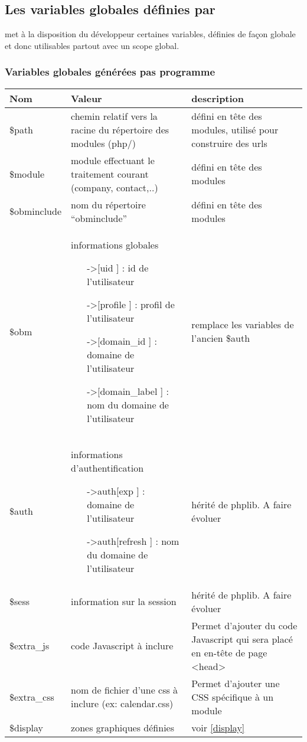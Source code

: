 

\subsection{Les variables globales définies par \obm}
\label{global_vars}

\obm met à la disposition du développeur certaines variables, définies de façon globale et donc utilisables partout avec un scope global.


\subsubsection{Variables globales générées pas programme}

\begin{tabular}{|p{2cm}|p{5cm}|p{6cm}|}
\hline
\textbf{Nom} & \textbf{Valeur} & \textbf{description}  \\
\hline
\$path & chemin relatif vers la racine du répertoire des modules (php/) & défini en tête des modules, utilisé pour construire des urls \\ 
\hline
\$module & module effectuant le traitement courant (company, contact,..) & défini en tête des modules \\ 
\hline
\$obminclude & nom du répertoire ``obminclude'' & défini en tête des modules \\ 
\hline
\$obm & informations globales
\begin{itemize}
\item[->[uid]] : id de l'utilisateur
\item[->[profile]] : profil de l'utilisateur
\item[->[domain\_id]] : domaine de l'utilisateur
\item[->[domain\_label]] : nom du domaine de l'utilisateur
\end{itemize}
 & remplace les variables de l'ancien \$auth\\ 
\hline
\$auth & informations d'authentification
\begin{itemize}
\item[->auth[exp]] : domaine de l'utilisateur
\item[->auth[refresh]] : nom du domaine de l'utilisateur
\end{itemize}
 & hérité de phplib. A faire évoluer \\ 
\hline
\$sess & information sur la session & hérité de phplib. A faire évoluer \\ 

\hline
\$extra\_js & code Javascript à inclure & Permet d'ajouter du code Javascript qui sera placé en en-tête de page <head> \\ 
\hline
\$extra\_css & nom de fichier d'une css à inclure (ex: calendar.css)& Permet d'ajouter une CSS spécifique à un module \\ 
\hline
\$display & zones graphiques définies & voir \ref{display} \\ 
\hline
\end{tabular}


